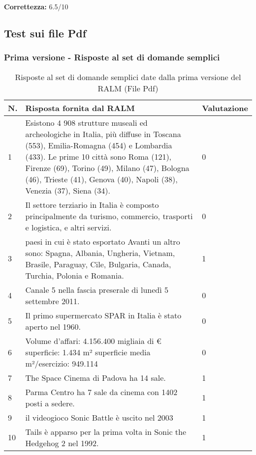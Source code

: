 \textbf{Correttezza:} 6.5/10


\subsection{Test sui file Pdf}

\subsubsection{Prima versione - Risposte al set di domande semplici}

\begin{table}[H]
    \centering
    \begin{tabular}{|p{0.5cm} |p{6cm} |p{2cm}|}
        \hline
        \textbf{N}. & \textbf{Risposta fornita dal RALM} & \textbf{Valutazione} \\
        \hline
        1 & Esistono 4 908 strutture museali ed archeologiche in Italia, più diffuse in Toscana (553), Emilia-Romagna (454) e Lombardia (433). Le prime 10 città sono Roma (121), Firenze (69), Torino (49), Milano (47), Bologna (46), Trieste (41), Genova (40), Napoli (38), Venezia (37), Siena (34). & 0 \\
        \hline
        2 & Il settore terziario in Italia è composto principalmente da turismo, commercio, trasporti e logistica, e altri servizi. & 0 \\
        \hline
        3 & paesi in cui è stato esportato Avanti un altro sono: Spagna, Albania, Ungheria, Vietnam, Brasile, Paraguay, Cile, Bulgaria, Canada, Turchia, Polonia e Romania. & 1 \\
        \hline
        4 & Canale 5 nella fascia preserale di lunedì 5 settembre 2011. & 0 \\
        \hline
        5 & Il primo supermercato SPAR in Italia è stato aperto nel 1960. & 0 \\
        \hline
        6 & Volume d'affari: 4.156.400 migliaia di €
        superficie: 1.434 m²
        superficie media m²/esercizio: 949.114 & 0 \\
        \hline
        7 & The Space Cinema di Padova ha 14 sale. & 1 \\
        \hline
        8 & Parma Centro ha 7 sale da cinema con 1402 posti a sedere. & 1 \\
        \hline
        9 & il videogioco Sonic Battle è uscito nel 2003 & 1 \\
        \hline
        10 & Tails è apparso per la prima volta in Sonic the Hedgehog 2 nel 1992. & 1 \\
        \hline
    \end{tabular}
    \caption{Risposte al set di domande semplici date dalla prima versione del RALM (File Pdf)}
\end{table}

